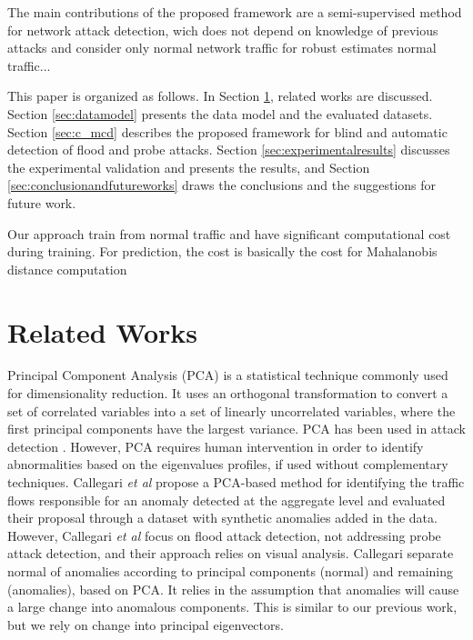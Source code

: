 \documentclass[review]{elsarticle}
\begin{document}
The main contributions of the proposed framework are a semi-supervised method for network attack detection, wich does not depend on knowledge of previous attacks and consider only normal network traffic for robust estimates normal traffic...

This paper is organized as follows. In Section \ref{sec:relatedworks}, related works are discussed. Section \ref{sec:datamodel} presents the data model and the evaluated datasets. Section \ref{sec:c_mcd} describes the proposed framework for blind and automatic detection of flood and probe attacks. Section \ref{sec:experimentalresults} discusses the experimental validation and presents the results, and Section \ref{sec:conclusionandfutureworks} draws the conclusions and the suggestions for future work.

Our approach train from normal traffic and have significant computational cost during training. For prediction, the cost is basically the cost for Mahalanobis distance computation

\section{Related Works}
\label{sec:relatedworks}

Principal Component Analysis (PCA) is a statistical technique commonly used for dimensionality reduction. It uses an orthogonal transformation to convert a set of correlated variables into a set of linearly uncorrelated variables, where the first principal components have the largest variance. PCA has been used in attack detection \cite{almotairi2009technique}. However, PCA requires human intervention in order to identify abnormalities based on the eigenvalues profiles, if used without complementary techniques. Callegari \emph{et al} \cite{callegari2011novel} propose a PCA-based method for identifying the traffic flows responsible for an anomaly detected at the aggregate level and evaluated their proposal through a dataset with synthetic anomalies added in the data. However, Callegari \emph{et al} focus on flood attack detection, not addressing probe attack detection, and their approach relies on visual analysis. Callegari separate normal of anomalies according to principal components (normal) and remaining (anomalies), based on PCA. It relies in the assumption that anomalies will cause a large change into anomalous components. This is similar to our previous work, but we rely on change into principal eigenvectors.
\end{document}
